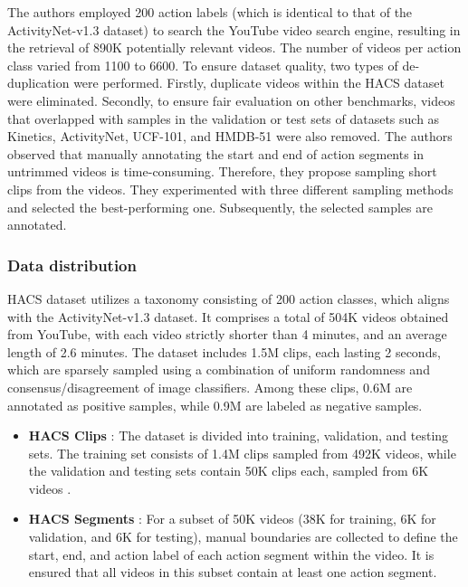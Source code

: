 \documentclass[10pt,onecolumn,letterpaper]{article}
\begin{document}
The authors employed 200 action labels (which is identical to that of the ActivityNet-v1.3 dataset) to search the YouTube video search engine, resulting in the retrieval of 890K potentially relevant videos. The number of videos per action class varied from 1100 to 6600. To ensure dataset quality, two types of de-duplication were performed. Firstly, duplicate videos within the HACS dataset were eliminated. Secondly, to ensure fair evaluation on other benchmarks, videos that overlapped with samples in the validation or test sets of datasets such as Kinetics, ActivityNet, UCF-101, and HMDB-51 were also removed. The authors observed that manually annotating the start and end of action segments in untrimmed videos is time-consuming. Therefore, they propose sampling short clips from the videos. They experimented with three different sampling methods and selected the best-performing one. Subsequently, the selected samples are annotated.
\subsubsection{Data distribution}

HACS dataset utilizes a taxonomy consisting of 200 action classes, which aligns with the ActivityNet-v1.3 dataset. It comprises a total of 504K videos obtained from YouTube, with each video strictly shorter than 4 minutes, and an average length of 2.6 minutes. The dataset includes 1.5M clips, each lasting 2 seconds, which are sparsely sampled using a combination of uniform randomness and consensus/disagreement of image classifiers. Among these clips, 0.6M are annotated as positive samples, while 0.9M are labeled as negative samples.

\begin{itemize}
	
	\item \textbf{HACS Clips} : The dataset is divided into training, validation, and testing sets. The training set consists of 1.4M clips sampled from 492K videos, while the validation and testing sets contain 50K clips each, sampled from 6K videos .

	\item \textbf{HACS Segments} : For a subset of 50K videos (38K for training, 6K for validation, and 6K for testing), manual boundaries are collected to define the start, end, and action label of each action segment within the video. It is ensured that all videos in this subset contain at least one action segment.

\end{itemize}
\end{document}
